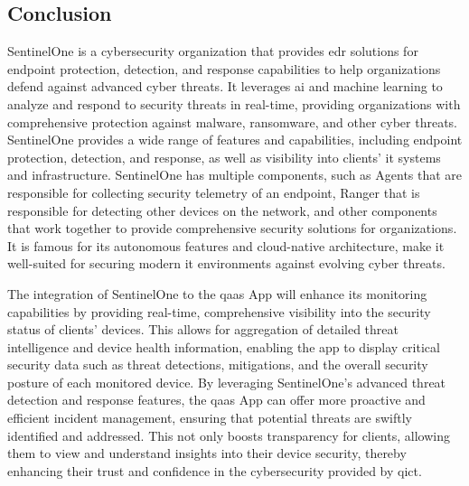 

\subsection{Conclusion}

SentinelOne is a cybersecurity organization that provides \acrshort{edr} solutions for endpoint protection, detection, and response
capabilities to help organizations defend against advanced cyber threats. It leverages \acrshort{ai} and machine learning to
analyze and respond to security threats in real-time, providing organizations with comprehensive protection against
malware, ransomware, and other cyber threats. SentinelOne provides a wide range of features and capabilities, including
endpoint protection, detection, and response, as well as visibility into clients' \acrshort{it} systems and infrastructure.
SentinelOne has multiple components, such as Agents that are responsible for collecting security telemetry of an endpoint,
Ranger that is responsible for detecting other devices on the network, and other components that work together to provide
comprehensive security solutions for organizations. It is famous for its autonomous features and cloud-native architecture,
make it well-suited for securing modern \acrshort{it} environments against evolving cyber threats.

The integration of SentinelOne to the \acrshort{qaas} App will enhance its monitoring capabilities by providing real-time,
comprehensive visibility into the security status of clients' devices. This allows for aggregation of detailed threat
intelligence and device health information, enabling the app to display critical security data such as threat detections,
mitigations, and the overall security posture of each monitored device. By leveraging SentinelOne's advanced threat
detection and response features, the \acrshort{qaas} App can offer more proactive and efficient incident management,
ensuring that potential threats are swiftly identified and addressed. This not only boosts transparency for clients,
allowing them to view and understand insights into their device security, thereby enhancing their trust and confidence
in the cybersecurity provided by \acrshort{qict}.

